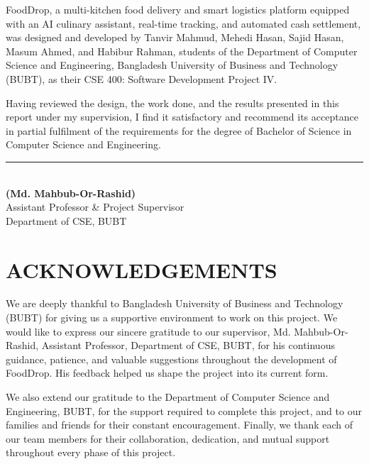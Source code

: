 \documentclass[12pt,a4paper]{report}
\begin{document}
FoodDrop, a multi-kitchen food delivery and smart logistics platform equipped with an AI culinary assistant, real-time tracking, and automated cash settlement, was designed and developed by Tanvir Mahmud, Mehedi Hasan, Sajid Hasan, Masum Ahmed, and Habibur Rahman, students of the Department of Computer Science and Engineering, Bangladesh University of Business and Technology (BUBT), as their CSE 400: Software Development Project IV.

Having reviewed the design, the work done, and the results presented in this report under my supervision, I find it satisfactory and recommend its acceptance in partial fulfilment of the requirements for the degree of Bachelor of Science in Computer Science and Engineering.

\vspace{3.5cm}
\noindent\rule{7cm}{0.4pt}\\
\textbf{(Md. Mahbub-Or-Rashid)}\\
Assistant Professor \& Project Supervisor\\
Department of CSE, BUBT

\newpage

\chapter*{ACKNOWLEDGEMENTS}

We are deeply thankful to Bangladesh University of Business and Technology (BUBT) for giving us a supportive environment to work on this project. We would like to express our sincere gratitude to our supervisor, Md. Mahbub-Or-Rashid, Assistant Professor, Department of CSE, BUBT, for his continuous guidance, patience, and valuable suggestions throughout the development of FoodDrop. His feedback helped us shape the project into its current form.

We also extend our gratitude to the Department of Computer Science and Engineering, BUBT, for the support required to complete this project, and to our families and friends for their constant encouragement. Finally, we thank each of our team members for their collaboration, dedication, and mutual support throughout every phase of this project.

\newpage

\end{document}
